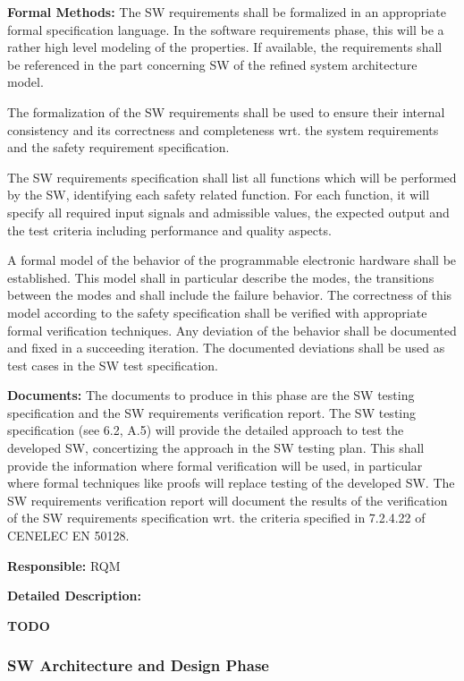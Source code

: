 {\bf Formal Methods:} The SW requirements shall be formalized in an appropriate
formal specification language. In the software requirements phase, this will be
a rather high level modeling of the properties. If available, the requirements
shall be referenced in the part concerning SW of the refined system architecture
model.

The formalization of the SW requirements shall be used to ensure their internal
consistency and its correctness and completeness wrt. the system requirements
and the safety requirement specification.

The SW requirements specification shall list all functions which will be
performed by the SW, identifying each safety related function. For each
function, it will specify all required input signals and admissible values, the
expected output and the test criteria including performance and quality aspects.

A formal model of the behavior of the programmable electronic hardware shall be
established. This model shall in particular describe the modes, the transitions
between the modes and shall include the failure behavior. The correctness of
this model according to the safety specification shall be verified with
appropriate formal verification techniques. Any deviation of the behavior shall
be documented and fixed in a succeeding iteration. The documented deviations
shall be used as test cases in the SW test specification.

{\bf Documents:} The documents to produce in this phase are the SW testing
specification and the SW requirements verification report. The SW testing
specification (see 6.2, A.5) will provide the detailed approach to test the
developed SW, concertizing the approach in the SW testing plan. This shall
provide the information where formal verification will be used, in particular
where formal techniques like proofs will replace testing of the developed SW.
The SW requirements verification report will document the results of the
verification of the SW requirements specification wrt. the criteria specified in
7.2.4.22 of CENELEC EN 50128.

{\bf Responsible:} RQM

{\bf Detailed Description:}

{\Huge\bf TODO}

\subsubsection{SW Architecture and Design Phase}
\label{sec:sw-arch-design}

